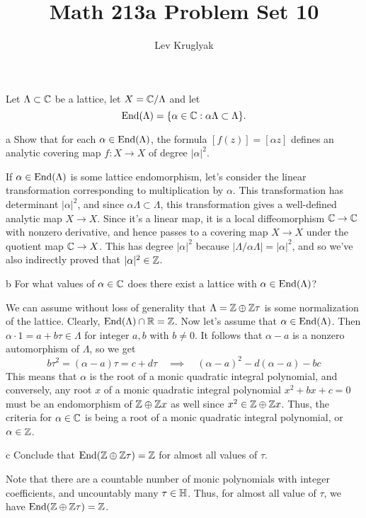 \documentclass{pset}
\title{Math 213a Problem Set 10}
\author{Lev Kruglyak}
\begin{document}
\maketitle
\collaborators

\begin{problem}{5.3}
  Let $\Lambda\subset \mathbb{C}$ be a lattice, let $X=\mathbb{C}/\Lambda$ and let
  \[\textrm{End}(\Lambda) = \{\alpha\in \mathbb{C} : \alpha\Lambda \subset \Lambda\}.\]
\end{problem}

\begin{parts}
  \begin{part}{a}
    Show that for each $\alpha\in\textrm{End}(\Lambda)$, the formula $[f(z)]=[\alpha z]$ defines an analytic covering map $f : X \to X$ of degree $|\alpha|^2$.
  \end{part}

  If $\alpha\in \textrm{End}(\Lambda)$ is some lattice endomorphism, let's consider the linear transformation corresponding to multiplication by $\alpha$. This transformation has determinant $|\alpha|^2$, and since $\alpha\Lambda \subset \Lambda$, this transformation gives a well-defined analytic map $X \to X$. Since it's a linear map, it is a local diffeomorphism $\mathbb{C} \to \mathbb{C}$ with nonzero derivative, and hence passes to a covering map $X \to X$ under the quotient map $\mathbb{C} \to X$. This has degree $|\alpha|^2$ because $|\Lambda / \alpha\Lambda|=|\alpha|^2$, and so we've also indirectly proved that $|\alpha|^2\in \mathbb{Z}$.

  \begin{part}{b}
    For what values of $\alpha\in \mathbb{C}$ does there exist a lattice with $\alpha\in \textrm{End}(\Lambda)$?
  \end{part}

  We can assume without loss of generality that $\Lambda = \mathbb{Z} \oplus \mathbb{Z}\tau$ is some normalization of the lattice. Clearly, $\textrm{End}(\Lambda)\cap \mathbb{R} = \mathbb{Z}$. Now let's assume that $\alpha\in \textrm{End}(\Lambda)$. Then $\alpha\cdot 1=a+b\tau\in \Lambda$ for integer $a,b$ with $b\neq 0$. It follows that $\alpha-a$ is a nonzero automorphism of $\Lambda$, so we get
  \[
      b\tau^2 = (\alpha - a)\tau = c+d\tau \quad \implies \quad (\alpha - a)^2- d(\alpha-a)-bc
  \]
  This means that $\alpha$ is the root of a monic quadratic integral polynomial, and conversely, any root $x$ of a monic quadratic integral polynomial $x^2+bx+c=0$ must be an endomorphism of $\mathbb{Z}\oplus \mathbb{Z} x$ as well since $x^2\in \mathbb{Z}\oplus \mathbb{Z} x$. Thus, the criteria for $\alpha\in \mathbb{C}$ is being a root of a monic quadratic integral polynomial, or $\alpha\in \mathbb{Z}$.

  \begin{part}{c}
    Conclude that $\textrm{End}(\mathbb{Z} \oplus \mathbb{Z}\tau)=\mathbb{Z}$ for almost all values of $\tau$.
  \end{part}
  Note that there are a countable number of monic polynomials with integer coefficients, and uncountably many $\tau\in \mathbb{H}$. Thus, for almost all value of $\tau$, we have $\textrm{End}(\mathbb{Z}\oplus \mathbb{Z}\tau)= \mathbb{Z}$.
\end{parts}
\end{document}
